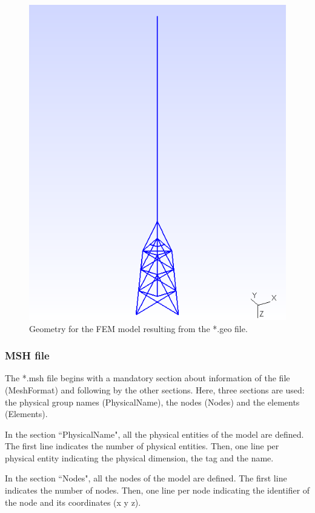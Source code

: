 \documentclass[a4]{article}
\begin{document}
\begin{figure}[tbh!]
	\centering
	\includegraphics[scale=0.6]{geo1.png}
	\caption{Geometry for the FEM model resulting from the *.geo file.}
	\label{fig:geo1}
\end{figure}

\subsubsection{MSH file}

The *.msh file begins with a mandatory section about information of the file (MeshFormat) and following by the other sections. Here, three sections are used: the physical group names (PhysicalName), the nodes (Nodes) and the elements (Elements).


In the section ``PhysicalName", all the physical entities of the model are defined. The first line indicates the number of physical entities. Then, one line per physical entity indicating the physical dimension, the tag and the name.  

In the section ``Nodes", all the nodes of the model are defined. The first line indicates the number of nodes. Then, one line per node indicating the identifier of the node and its coordinates (x y z).
\end{document}
